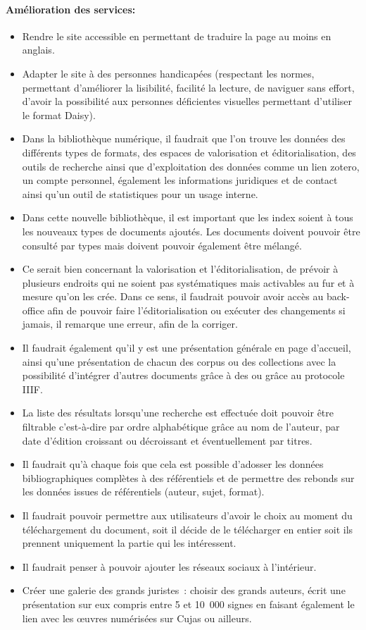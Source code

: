 \paragraph*{Amélioration des services:}
\begin{itemize}
	\item Rendre le site accessible en permettant de traduire la page au moins en anglais.
\item Adapter le site à des personnes handicapées (respectant les normes, permettant d’améliorer la lisibilité, facilité la lecture, de naviguer sans effort, d’avoir la possibilité aux personnes déficientes visuelles permettant d’utiliser le format Daisy).
\item Dans la bibliothèque numérique, il faudrait que l’on trouve les données des différents types de formats, des espaces de valorisation et éditorialisation, des outils de recherche ainsi que d’exploitation des données comme un lien zotero, un compte personnel, également les informations juridiques et de contact ainsi qu’un outil de statistiques pour un usage interne.
\item Dans cette nouvelle bibliothèque, il est important que les index soient à tous les nouveaux types de documents ajoutés. Les documents doivent pouvoir être consulté par types mais doivent pouvoir également être mélangé. 
\item Ce serait bien concernant la valorisation et l’éditorialisation, de prévoir à plusieurs endroits qui ne soient pas systématiques mais activables au fur et à mesure qu’on les crée. Dans ce sens, il faudrait pouvoir avoir accès au back-office afin de pouvoir faire l’éditorialisation ou exécuter des changements si jamais, il remarque une erreur, afin de la corriger. 
\item Il faudrait également qu’il y est une présentation générale en page d’accueil, ainsi qu’une présentation de chacun des corpus ou des collections avec la possibilité d’intégrer d’autres documents grâce à des ou grâce au protocole IIIF.
\item La liste des résultats lorsqu’une recherche est effectuée doit pouvoir être filtrable c’est-à-dire par ordre alphabétique grâce au nom de l’auteur, par date d’édition croissant ou décroissant et éventuellement par titres.
\item Il faudrait qu’à chaque fois que cela est possible d’adosser les données bibliographiques complètes à des référentiels et de permettre des rebonds sur les données issues de référentiels (auteur, sujet, format).
\item Il faudrait pouvoir permettre aux utilisateurs d’avoir le choix au moment du téléchargement du document, soit il décide de le télécharger en entier soit ils prennent uniquement la partie qui les intéressent.
\item Il faudrait penser à pouvoir ajouter les réseaux sociaux à l’intérieur. 
\item Créer une galerie des grands juristes : choisir des grands auteurs, écrit une présentation sur eux compris entre 5 et 10 000 signes en faisant également le lien avec les œuvres numérisées sur Cujas ou ailleurs. 
\end{itemize}
